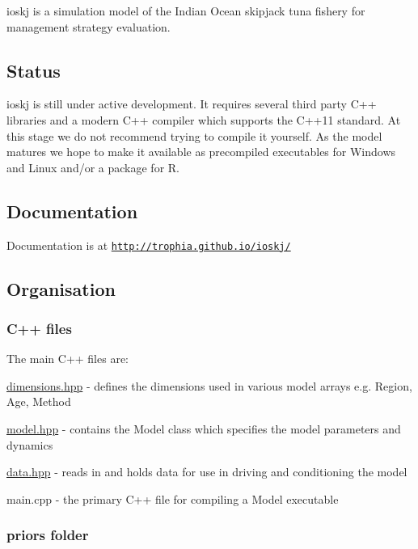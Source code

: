 {\ttfamily ioskj} is a simulation model of the Indian Ocean skipjack tuna fishery for management strategy evaluation.

\subsection*{Status}

{\ttfamily ioskj} is still under active development. It requires several third party C++ libraries and a modern C++ compiler which supports the C++11 standard. At this stage we do not recommend trying to compile it yourself. As the model matures we hope to make it available as precompiled executables for Windows and Linux and/or a package for R.

\subsection*{Documentation}

Documentation is at \href{http://trophia.github.io/ioskj/}{\tt http\-://trophia.\-github.\-io/ioskj/}

\subsection*{Organisation}

\subsubsection*{C++ files}

The main C++ files are\-:


\begin{DoxyItemize}
\item {\ttfamily \hyperlink{dimensions_8hpp_source}{dimensions.\-hpp}} -\/ defines the dimensions used in various model arrays e.\-g. {\ttfamily Region}, {\ttfamily Age}, {\ttfamily Method}
\item {\ttfamily \hyperlink{model_8hpp_source}{model.\-hpp}} -\/ contains the {\ttfamily Model} class which specifies the model parameters and dynamics
\item {\ttfamily \hyperlink{data_8hpp_source}{data.\-hpp}} -\/ reads in and holds data for use in driving and conditioning the model
\item {\ttfamily main.\-cpp} -\/ the primary C++ file for compiling a {\ttfamily Model} executable
\end{DoxyItemize}

\subsubsection*{{\ttfamily priors} folder}

